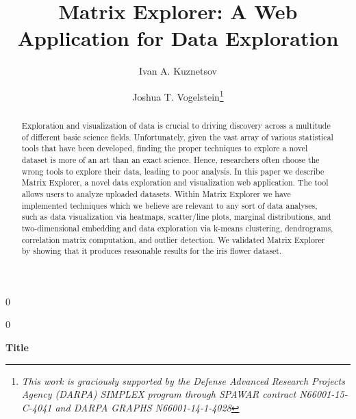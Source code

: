 \documentclass[12pt]{article}
\newcommand{\blind}{0}
\begin{document}
%

\def\spacingset#1{\renewcommand{\baselinestretch}%
{#1}\small\normalsize} \spacingset{1}
\setlength{\parindent}{5ex}


\blind
{
  \title{\bf Matrix Explorer: A Web Application for Data Exploration}
  \author[1]{Ivan A. Kuznetsov}
  \author[1,2]{Joshua T. Vogelstein\thanks{\textit{This work is graciously supported by the Defense Advanced Research Projects Agency (DARPA) SIMPLEX program through SPAWAR contract N66001-15-C-4041 and DARPA GRAPHS N66001-14-1-4028}}}
  \maketitle
} \fi

\blind
{
  \bigskip
  \bigskip
  \begin{center}
    {\LARGE\bf Title}
\end{center}
  \medskip
} \fi

\bigskip
\begin{abstract}
\noindent Exploration and visualization of data is crucial to driving discovery across a multitude of different basic science fields. Unfortunately, given the vast array of various statistical tools that have been developed, finding the proper techniques to explore a novel dataset is more of an art than an exact science. Hence, researchers often choose the wrong tools to explore their data, leading to poor analysis. In this paper we describe Matrix Explorer, a novel data exploration and visualization web application. The tool allows users to analyze uploaded datasets. Within Matrix Explorer we have implemented techniques which we believe are relevant to any sort of data analyses, such as data visualization via heatmaps, scatter/line plots, marginal distributions, and two-dimensional embedding and data exploration via k-means clustering, dendrograms, correlation matrix computation, and outlier detection. We validated Matrix Explorer by showing that it produces reasonable results for the iris flower dataset.
\end{abstract}
\end{document}

